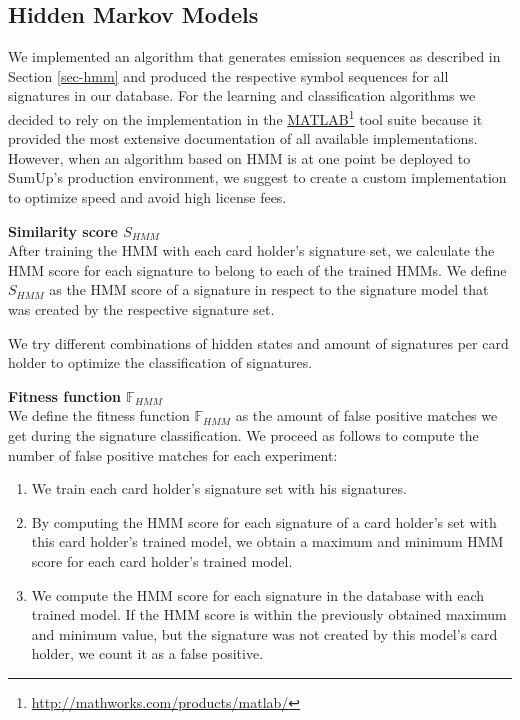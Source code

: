 \documentclass[a4paper, oneside]{csthesis}
\newcommand\fnurl[2]{%
  \href{#2}{#1}\footnote{\url{#2}}%
}
\begin{document}
\newpage

\subsection{Hidden Markov Models}
\label{sec:hidden-markov-models}

We implemented an algorithm that generates emission sequences as described in Section \ref{sec-hmm} and produced the respective symbol sequences for all signatures in our database.
For the learning and classification algorithms we decided to rely on the implementation in the \fnurl{MATLAB}{http://mathworks.com/products/matlab/}  tool suite because it provided the most extensive documentation of all available implementations. However, when an algorithm based on HMM is at one point be deployed to SumUp's production environment, we suggest to create a custom implementation to optimize speed and avoid high license fees.

\textbf{Similarity score $S_{HMM}$}\\
After training the HMM with each card holder's signature set, we calculate the HMM score for each signature to belong to each of the trained HMMs. We define $S_{HMM}$ as the HMM score of a signature in respect to the signature model that was created by the respective signature set.

We try different combinations of hidden states and amount of signatures per card holder to optimize the classification of signatures.

\textbf{Fitness function $\mathbb{F}_{HMM}$}\\
We define the fitness function $\mathbb{F}_{HMM}$ as the amount of false positive matches we get during the signature classification. We proceed as follows to compute the number of false positive matches for each experiment:

\begin{enumerate}
\item We train each card holder's signature set with his signatures.
\item By computing the HMM score for each signature of a card holder's set with this card holder's trained model, we obtain a maximum and minimum HMM score for each card holder's trained model.
\item We compute the HMM score for each signature in the database with each trained model. If the HMM score is within the previously obtained maximum and minimum value, but the signature was not created by this model's card holder, we count it as a false positive.
\end{enumerate}
\end{document}
